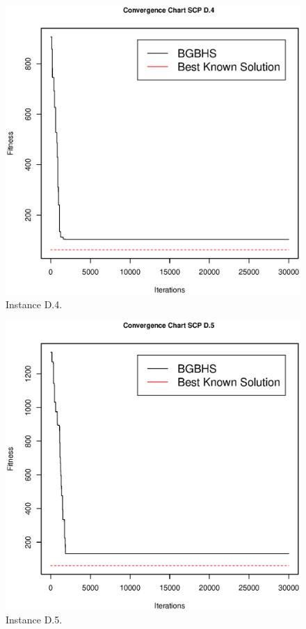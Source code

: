 \begin{figure}[]
\centering
\includegraphics[scale=.45]{Resultados/scpD4.eps}
\caption{Instance D.4.}
\label{fig:Instance.D.4}
\end{figure}

\begin{figure}[]
\centering
\includegraphics[scale=.45]{Resultados/scpD5.eps}
\caption{Instance D.5.}
\label{fig:Instance.D.5}
\end{figure}
